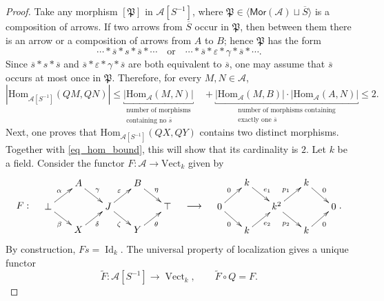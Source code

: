 \documentclass[10pt,a4paper]{amsart}
\theoremstyle{plain}
\theoremstyle{definition}
\theoremstyle{remark}
\begin{document}
\begin{proof}
  Take any morphism $[\mathfrak P]$ in $\mathcal{A}[S^{-1}]$, where $\mathfrak P \in \langle\mathsf{Mor}(\mathcal A)\sqcup\overline S\rangle$ is a composition of arrows.
  If two arrows from $\overline {S}$ occur in $\mathfrak P$, then between them there is an arrow or a composition of arrows from $A$ to $B$; hence $\mathfrak P$ has the form
  \[
    \cdots \ast \overline s \ast s \ast \overline s \ast \cdots \quad \text{or} \quad \cdots \ast \overline s \ast \varepsilon \ast \gamma \ast \overline s \ast \cdots.
  \]
  Since $\overline s \ast s \ast \overline s$ and $\overline s \ast \varepsilon \ast \gamma \ast \overline s$ are both equivalent to $\overline s$, one may assume that $\overline s$ occurs at most once in $\mathfrak P$.
  Therefore, for every $M, N \in \mathcal{A}$,
  \begin{equation}\label{eq_hom_bound}
    |\mathrm{Hom}_{\mathcal{A}[S^{-1}]}(QM,QN)|
    \leq \underset{\substack{\text{number of morphisms}\\\text{containing no }\overline s}}{\underbracket{|\mathrm{Hom}_{\mathcal{A}}(M,N)|}}
    \quad + \underset{\substack{\text{number of morphisms containing}\\\text{exactly one }\overline s}}{\underbracket{|\mathrm{Hom}_{\mathcal{A}}(M,B)| \cdot |\mathrm{Hom}_{\mathcal{A}}(A,N)|}}
    \leq 2.
  \end{equation}
  Next, one proves that $\mathrm{Hom}_{\mathcal A[S^{-1}]}(QX,QY)$ contains two distinct morphisms.
  Together with \eqref{eq_hom_bound}, this will show that its cardinality is $2$.
  Let $k$ be a field.
  Consider the functor $F : \mathcal{A} \to \mathrm{Vect}_k$ given by
  \[
    F :\quad
    \vcenter{\hbox{$\xymatrix@C=6mm@R=4mm{
      &A\ar[dr]^{\gamma}&&B\ar[dr]^{\eta}&\\
      \bot\ar[ur]^{\alpha}\ar[dr]_{\beta}&&
      J\ar[ur]^{\varepsilon}\ar[dr]_{\zeta}&&\top\\
      &X\ar[ur]_{\delta}&&Y\ar[ur]_{\theta}&
      }$}} \quad
    \longrightarrow \quad
    \vcenter{\hbox{$\xymatrix@C=6mm@R=4mm{
      &k\ar[dr]^{e_1}&&k\ar[dr]^{0}&\\
      0\ar[ur]^{0}\ar[dr]_{0}&&
      k^2\ar[ur]^{p_1}\ar[dr]_{p_2}&&0\\
      &k\ar[ur]_{e_2}&&k\ar[ur]_{0}&
      }$}}.
  \]
  By construction, $Fs = \operatorname{Id}_k$.
  The universal property of localization gives a unique functor
  \[
    \widetilde F:\mathcal A[S^{-1}]
    \longrightarrow\operatorname{Vect}_k,
    \qquad \widetilde F\circ Q=F.
\]
\end{proof}
\end{document}
